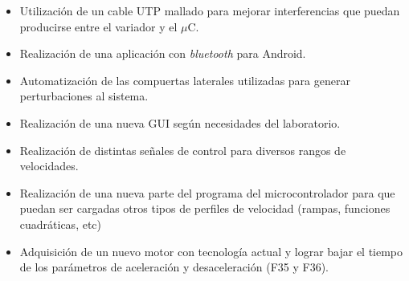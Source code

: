 \begin{itemize}
	\item Utilización de un cable UTP mallado para mejorar interferencias que puedan producirse entre el variador y el $\mu$C.
\item Realización de una aplicación con \textit{bluetooth} para Android.
\item Automatización de las compuertas laterales utilizadas para generar perturbaciones al sistema.
\item Realización de una nueva GUI según necesidades del laboratorio.
\item Realización de distintas señales de control para diversos rangos de velocidades.
\item Realización de una nueva parte del programa del microcontrolador para que puedan ser cargadas otros tipos de perfiles de velocidad (rampas, funciones cuadráticas, etc)
\item Adquisición de un nuevo motor con tecnología actual y lograr bajar el tiempo de los parámetros de aceleración y desaceleración (F35 y F36).
\end{itemize}
